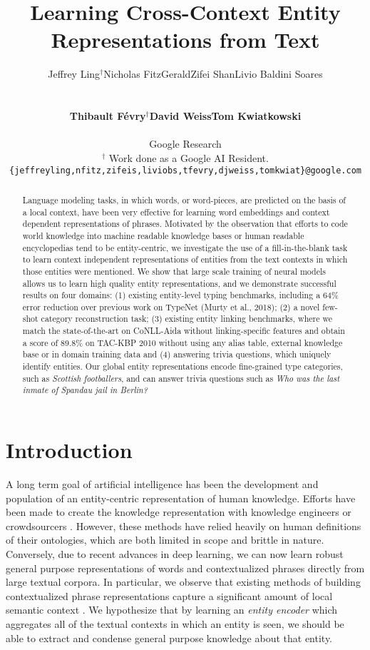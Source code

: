\documentclass{article} \usepackage{iclr2020_conference,times}
\title{Learning Cross-Context Entity Representations from Text}
\author{\centerline{Jeffrey Ling$^\dagger$\quad Nicholas FitzGerald\quad Zifei Shan\quad Livio Baldini Soares}\\
{\centerline{\bf Thibault F\'evry$^\dagger$\quad David Weiss\quad Tom Kwiatkowski}} \\
Google Research\\
$^\dagger$ Work done as a Google AI Resident.\\ 
\texttt{\{\small jeffreyling,nfitz,zifeis,liviobs,tfevry,djweiss,tomkwiat\}@google.com} \\
}
\begin{document}
\maketitle

\begin{abstract}
Language modeling tasks, in which words, or word-pieces, are predicted on the basis of a local context, have been very effective for learning word embeddings and context dependent representations of phrases.
Motivated by the observation that efforts to code world knowledge into machine readable knowledge bases or human readable encyclopedias tend to be entity-centric, we investigate the use of a fill-in-the-blank task to learn context independent representations of entities from the text contexts in which those entities were mentioned.
We show that large scale training of neural models allows us to learn high quality entity representations, and we demonstrate successful results on four domains: (1) existing entity-level typing benchmarks, including a 64\% error reduction over previous work on TypeNet (Murty et al., 2018); (2) a novel few-shot category reconstruction task; (3) existing entity linking benchmarks, where we match the state-of-the-art on CoNLL-Aida without linking-specific features and obtain a score of 89.8\% on TAC-KBP 2010 without using any alias table, external knowledge base or in domain training data and (4) answering trivia questions, which uniquely identify entities.
Our global entity representations encode fine-grained type categories, such as \emph{Scottish footballers}, and can answer trivia questions such as \emph{Who was the last inmate of Spandau jail in Berlin?}
\end{abstract}

\section{Introduction}



A long term goal of artificial intelligence has been the development and population of an entity-centric representation of human knowledge. 
Efforts have been made to create the knowledge representation with knowledge engineers \citep{lenat1986cyc} or crowdsourcers \citep{bollacker2008freebase}.
However, these methods have relied heavily on human definitions of their ontologies, which are both limited in scope and brittle in nature.
Conversely, due to recent advances in deep learning, we can now learn robust general purpose representations of words \citep{mikolov2013distributed} and contextualized phrases \citep{peters2018deep} directly from large textual corpora.
In particular, we observe that existing methods of building contextualized phrase representations capture a significant amount of local semantic context \citep{devlin2018bert}.
We hypothesize that by learning an \emph{entity encoder} which aggregates all of the textual contexts in which an entity is seen, we should be able to extract and condense general purpose knowledge about that entity.
\end{document}
